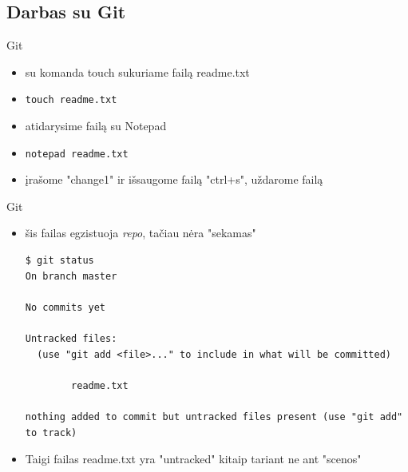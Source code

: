 \documentclass[11pt,xcolor=table]{beamer}
\begin{document}
\subsection{Darbas su Git}

\begin{frame}[fragile]{Git}
\begin{itemize}
\item su komanda touch sukuriame failą readme.txt
\item \colorbox{listinggray}{\lstinline|touch readme.txt|}
\item atidarysime failą su Notepad
\item \colorbox{listinggray}{\lstinline|notepad readme.txt|}
\item įrašome "change1" ir išsaugome failą "ctrl+s", uždarome failą
\end{itemize}
\end{frame}


\begin{frame}[fragile]{Git}
\begin{itemize}
\item šis failas egzistuoja \textit{repo}, tačiau nėra "sekamas"
\begin{lstlisting}
$ git status
On branch master

No commits yet

Untracked files:
  (use "git add <file>..." to include in what will be committed)

        readme.txt

nothing added to commit but untracked files present (use "git add" to track)
\end{lstlisting}
\item Taigi failas readme.txt yra "untracked" kitaip tariant ne ant "scenos"
\end{itemize}
\end{frame}
\end{document}
